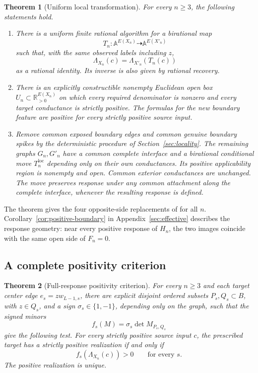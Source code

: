 \documentclass[11pt]{article}
\newtheorem{theorem}{Theorem}[section]
\theoremstyle{definition}
\newcommand{\RR}{\mathbb R}
\newcommand{\Aparam}{\mathbb A}
\begin{document}
\begin{theorem}[Uniform local transformation]
\label{thm:main}
For every \(n\ge3\), the following statements hold.
\begin{enumerate}
\item There is a uniform finite rational algorithm for a birational map
\[
 T_n:\Aparam^{E(X_n)}\dashrightarrow\Aparam^{E(X'_n)}
\]
such that, with the same observed labels including \(z\),
\[
 \Lambda_{X_n}(c)=\Lambda_{X'_n}(T_n(c))
\]
as a rational identity. Its inverse is also given by rational recovery.
\item There is an explicitly constructible nonempty Euclidean open box
\(U_n\subset\RR_{>0}^{E(X_n)}\) on which every required denominator
is nonzero and every target conductance is strictly positive.
The formulas for the new boundary feature are positive for every
strictly positive source input.
\item Remove common exposed boundary edges and common genuine boundary
spikes by the deterministic procedure of
Section~\ref{sec:locality}. The remaining graphs \(G_n,G'_n\) have
a common complete interface and a birational conditional move
\(T_n^{\mathrm{loc}}\) depending only on their own conductances.
Its positive applicability region is nonempty and open.
Common exterior conductances are unchanged. The move preserves
response under any common attachment along the complete interface,
whenever the resulting response is defined.
\end{enumerate}
\end{theorem}

The theorem gives the four opposite-side replacements of
\cite[Conjecture 4]{ABCC} for all \(n\).
Corollary~\ref{cor:positive-boundary} in Appendix~\ref{sec:effective}
describes the response geometry: near every positive response of \(H_n\), the
two images coincide with the same open side of \(F_n=0\).

\subsection{A complete positivity criterion}

\begin{theorem}[Full-response positivity criterion]
\label{thm:source-positivity}
For every $n\ge3$ and each target center edge $e_s=zw_{L-1,s}$,
there are explicit
disjoint ordered subsets $P_s,Q_s\subset B$, with $z\in Q_s$,
and a sign $\sigma_s\in\{1,-1\}$, depending only on the graph,
such that the signed minors
\begin{equation}
 f_s(M)=\sigma_s\det M_{P_s,Q_s}
 \label{eq:separating-minor}
\end{equation}
give the following test. For every strictly positive source input $c$,
the prescribed target has a strictly positive realization if and only if
\begin{equation}
 f_s(\Lambda_{X_n}(c))>0\qquad\text{for every }s.
 \label{eq:full-source-criterion}
\end{equation}
The positive realization is unique.
\end{theorem}
\end{document}
